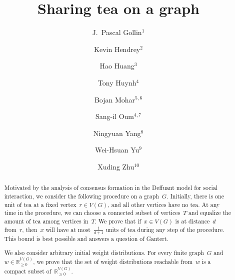 \documentclass[reqno, 12pt]{amsart}
\numberwithin{equation}{section}
\numberwithin{figure}{section}
\theoremstyle{plain}
\theoremstyle{definition}
\newcommand*{\weights}{\ensuremath{\mathbb{R}_{\geq 0}^{V(G)}}}
\begin{document}
\author[Gollin]{J.~Pascal Gollin$^1$}
\address{$^1$FAMNIT,
University of Primorska, Koper, Slovenia}
\author[Hendrey]{Kevin Hendrey$^2$}
\address{$^2$School of Mathematics, Monash University, Melbourne, Australia}

\author[Huang]{Hao Huang$^3$}
\address{$^3$Department of Mathematics, National University of Singapore,~Singapore}

\author[Huynh]{Tony Huynh$^4$}
\address{$^4$Discrete Mathematics Group, Institute for Basic Science (IBS), Daejeon, South Korea}


\author[Mohar]{Bojan Mohar$^{5,6}$}
\address{$^5$Department of Mathematics, Simon Fraser University, Burnaby, Canada}
\address{$^6$Faculty of Mathematics and Physics, University of Ljubljana, Ljubljana, Slovenia}

\author[Oum]{Sang-il Oum$^{4,7}$}
\address{$^7$Department of Mathematical Sciences, KAIST,  Daejeon,~South~Korea}

\author[Yang]{Ningyuan Yang$^{8}$}
\address{$^8$School of Mathematical Sciences, Fudan University,  Shanghai, China}

\author[Yu]{Wei-Hsuan Yu$^{9}$}
\address{$^9$Department of Mathematics, National Central University, Chungli, Taoyuan, Taiwan}

\author[Zhu]{Xuding Zhu$^{10}$}
\address{$^{10}$School of Mathematical Sciences, Zhejiang Normal University, Jinhua, China}



\title[Sharing tea on a graph]{Sharing tea on a graph}

\begin{abstract}
    Motivated by the analysis of consensus formation in the Deffuant model for social interaction, we consider the following procedure on a graph~$G$.  
    Initially, there is one unit of  tea at a fixed vertex~${r \in V(G)}$, and all other vertices have no tea.  
    At any time in the procedure, we can choose a connected subset of vertices~$T$ and equalize the amount of tea among vertices in~$T$.  
    We prove that if~${x \in V(G)}$ is at distance~$d$ from~$r$, then~$x$ will have at most~$\frac{1}{d+1}$ units of tea during any step of the procedure. 
    This bound is best possible and answers a question of Gantert. 

    We also consider arbitrary initial weight distributions. 
    For every finite graph~$G$ and~${w \in \weights}$, we prove that the set of weight distributions reachable from~$w$ is a compact subset of~$\weights$.  
\end{abstract}
\end{document}
